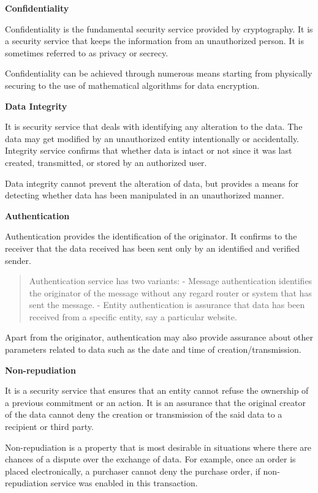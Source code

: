 \documentclass[11pt]{article}
\begin{document}
\textbf{Confidentiality}

Confidentiality is the fundamental security service provided by
cryptography. It is a security service that keeps the information from
an unauthorized person. It is sometimes referred to as privacy or
secrecy.

Confidentiality can be achieved through numerous means starting from
physically securing to the use of mathematical algorithms for data
encryption.

\textbf{Data Integrity}

It is security service that deals with identifying any alteration to the
data. The data may get modified by an unauthorized entity intentionally
or accidentally. Integrity service confirms that whether data is intact
or not since it was last created, transmitted, or stored by an
authorized user.

Data integrity cannot prevent the alteration of data, but provides a
means for detecting whether data has been manipulated in an unauthorized
manner.

\textbf{Authentication}

Authentication provides the identification of the originator. It
confirms to the receiver that the data received has been sent only by an
identified and verified sender.

\begin{quote}
Authentication service has two variants: - Message authentication
identifies the originator of the message without any regard router or
system that has sent the message. - Entity authentication is assurance
that data has been received from a specific entity, say a particular
website.
\end{quote}

Apart from the originator, authentication may also provide assurance
about other parameters related to data such as the date and time of
creation/transmission.

\textbf{Non-repudiation}

It is a security service that ensures that an entity cannot refuse the
ownership of a previous commitment or an action. It is an assurance that
the original creator of the data cannot deny the creation or
transmission of the said data to a recipient or third party.

Non-repudiation is a property that is most desirable in situations where
there are chances of a dispute over the exchange of data. For example,
once an order is placed electronically, a purchaser cannot deny the
purchase order, if non-repudiation service was enabled in this
transaction.
\end{document}
